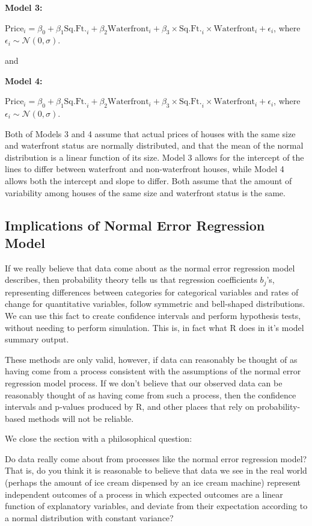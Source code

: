 \documentclass[
  letterpaper,
  DIV=11,
  numbers=noendperiod]{scrreprt}
\begin{document}
\textbf{Model 3:}

\(\text{Price}_i = \beta_0 + \beta_1\text{Sq.Ft.}_{i}+ \beta_2\text{Waterfront}_{i}+ \beta_3\times\text{Sq.Ft.}_i\times\text{Waterfront}_{i} + \epsilon_i\),
where \(\epsilon_i\sim\mathcal{N}(0,\sigma)\).

and

\textbf{Model 4:}

\(\text{Price}_i = \beta_0 + \beta_1\text{Sq.Ft.}_{i}+ \beta_2\text{Waterfront}_{i}+ \beta_3\times\text{Sq.Ft.}_i\times\text{Waterfront}_{i} + \epsilon_i\),
where \(\epsilon_i\sim\mathcal{N}(0,\sigma)\).

Both of Models 3 and 4 assume that actual prices of houses with the same
size and waterfront status are normally distributed, and that the mean
of the normal distribution is a linear function of its size. Model 3
allows for the intercept of the lines to differ between waterfront and
non-waterfront houses, while Model 4 allows both the intercept and slope
to differ. Both assume that the amount of variability among houses of
the same size and waterfront status is the same.

\subsection{Implications of Normal Error Regression
Model}\label{implications-of-normal-error-regression-model}

If we really believe that data come about as the normal error regression
model describes, then probability theory tells us that regression
coefficients \(b_j\)'s, representing differences between categories for
categorical variables and rates of change for quantitative variables,
follow symmetric and bell-shaped distributions. We can use this fact to
create confidence intervals and perform hypothesis tests, without
needing to perform simulation. This is, in fact what R does in it's
model summary output.

These methods are only valid, however, if data can reasonably be thought
of as having come from a process consistent with the assumptions of the
normal error regression model process. If we don't believe that our
observed data can be reasonably thought of as having come from such a
process, then the confidence intervals and p-values produced by R, and
other places that rely on probability-based methods will not be
reliable.

We close the section with a philosophical question:

Do data really come about from processes like the normal error
regression model? That is, do you think it is reasonable to believe that
data we see in the real world (perhaps the amount of ice cream dispensed
by an ice cream machine) represent independent outcomes of a process in
which expected outcomes are a linear function of explanatory variables,
and deviate from their expectation according to a normal distribution
with constant variance?
\end{document}
